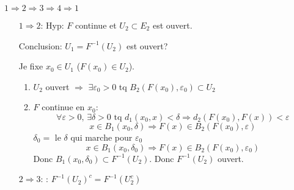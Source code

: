 \documentclass[a4paper]{report}
\let\implies\Rightarrow
\let\epsilon\varepsilon
\theoremstyle{definition}
\begin{document}
\begin{preuve}
   $1 \implies 2 \implies 3 \implies 4 \implies 1$ 
   \begin{itemize}
       \item[$1 \implies 2$:] Hyp: $F$ continue et  $U_2 \subset E_2$ est ouvert.
           \par
           Conclusion: $U_1 = F^{-1}(U_2)$ est ouvert?
           \par
           Je fixe $x_0 \in U_1$ ($F(x_0) \in U_2$).
           \begin{enumerate}
               \item $U_2$ ouvert $\implies$ $\exists \epsilon_0 > 0$ tq $B_2(F(x_0), \epsilon_0) \subset U_2$
               \item $F$ continue en  $x_0$: 
                   \[
                   \forall \epsilon > 0, \, \exists \delta > 0 \text{ tq } d_1(x_0, x) < \delta \implies d_2(F(x_0), F(x)) < \epsilon
                   \] 
                   \[
                   x \in B_1(x_0, \delta) \implies F(x) \in B_2(F(x_0), \epsilon)
                   \] 
                   $\delta_0 = $ le  $\delta$ qui marche pour  $\epsilon_0$
                    \[
                   x \in B_1(x_0, \delta_0) \implies F(x) \in B_2(F(x_0), \epsilon_0)
                   \] 
                   Donc $B_1(x_0, \delta_0) \subset F^{-1}(U_2)$. Donc $F^{-1}(U_2)$ ouvert.
           \end{enumerate}
       \item[$2 \implies 3$:]: $F^{-1}(U_2)^{c} = F^{-1}(U_2^c)$
   \end{itemize}
\end{preuve}
\end{document}
